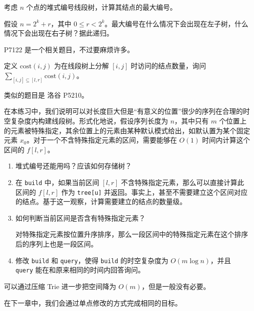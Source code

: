 \begin{exercise}[堆式标号线段树的最大标号]
    考虑 $n$ 个点的堆式编号线段树，计算其结点的最大编号。
    \begin{hint}[提示]
            假设 $n=2^k+r$，其中 $0\le r<2^k$。最大编号在什么情况下会出现在左子树，什么情况下会出现在右子树？据此递归。
    \end{hint}
\end{exercise}
\begin{remark}
    P7122 是一个相关题目，不过要麻烦许多。
\end{remark}

\begin{exercise}[51nod 1792]
    定义 $\text{cost}(i,j)$ 为在线段树上分解 $[i,j]$ 时访问的结点数量，询问 $\sum_{[i,j]\subseteq [l,r]}\text{cost}(i,j)$。

    类似的题目是 洛谷 P5210。
\end{exercise}

\begin{exercise}[线段树的动态开点]
    在本练习中，我们说明可以对长度巨大但是“有意义的位置”很少的序列在合理的时空复杂度内构建线段树。形式化地说，假设序列长度为 $n$，其中只有 $m$ 个位置上的元素被特殊指定，其余位置上的元素由某种默认模式给出，如默认置为某个固定元素 $x_0$。对于一个不含特殊指定元素的区间，需要能够在 $O(1)$ 时间内计算这个区间的 $f[l,r]$。
    
    \begin{enumerate}
        \item 堆式编号还能用吗？应该如何存储树？
        \item 在 \texttt{build} 中，如果当前区间 $[l,r]$ 不含特殊指定元素，那么可以直接计算此区间的 $f[l,r]$ 作为 \texttt{tree[u]} 并返回。事实上，甚至不需要建立这个区间对应的结点。基于这一观察，计算需要建立的结点的数量级。
        \item 如何判断当前区间是否含有特殊指定元素？\begin{hint}
        对特殊指定元素按位置升序排序，那么一段区间中的特殊指定元素在这个排序后的序列上也是一段区间。
        \end{hint}
        \item 修改 \texttt{build} 和 \texttt{query}，使得 \texttt{build} 的时空复杂度为 $O(m\log n)$，并且 \texttt{query} 能在和原来相同的时间内回答询问。
    \end{enumerate}
\end{exercise}
\begin{remark}
    可以通过压缩 Trie 进一步把空间降为 $O(m)$，但是一般没有必要。
\end{remark}
\begin{remark}
    在下一章中，我们会通过单点修改的方式完成相同的目标。
\end{remark}

